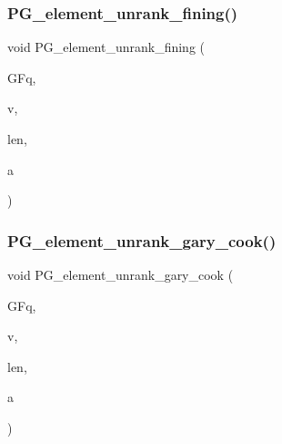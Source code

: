 \mbox{\label{projective_8_c_af6ee4c5928ba840f36c0d36242020520}} 
\subsubsection{\texorpdfstring{P\+G\+\_\+element\+\_\+unrank\+\_\+fining()}{PG\_element\_unrank\_fining()}}
{\footnotesize\ttfamily void P\+G\+\_\+element\+\_\+unrank\+\_\+fining (\begin{DoxyParamCaption}\item[{\mbox{\hyperlink{classfinite__field}{finite\+\_\+field}} \&}]{G\+Fq,  }\item[{\mbox{\hyperlink{galois_8h_a09fddde158a3a20bd2dcadb609de11dc}{I\+NT}} $\ast$}]{v,  }\item[{\mbox{\hyperlink{galois_8h_a09fddde158a3a20bd2dcadb609de11dc}{I\+NT}}}]{len,  }\item[{\mbox{\hyperlink{galois_8h_a09fddde158a3a20bd2dcadb609de11dc}{I\+NT}}}]{a }\end{DoxyParamCaption})}

\mbox{\label{projective_8_c_a45409486197cc2b9c8ed3192c165ecf5}} 
\subsubsection{\texorpdfstring{P\+G\+\_\+element\+\_\+unrank\+\_\+gary\+\_\+cook()}{PG\_element\_unrank\_gary\_cook()}}
{\footnotesize\ttfamily void P\+G\+\_\+element\+\_\+unrank\+\_\+gary\+\_\+cook (\begin{DoxyParamCaption}\item[{\mbox{\hyperlink{classfinite__field}{finite\+\_\+field}} \&}]{G\+Fq,  }\item[{\mbox{\hyperlink{galois_8h_a09fddde158a3a20bd2dcadb609de11dc}{I\+NT}} $\ast$}]{v,  }\item[{\mbox{\hyperlink{galois_8h_a09fddde158a3a20bd2dcadb609de11dc}{I\+NT}}}]{len,  }\item[{\mbox{\hyperlink{galois_8h_a09fddde158a3a20bd2dcadb609de11dc}{I\+NT}}}]{a }\end{DoxyParamCaption})}

